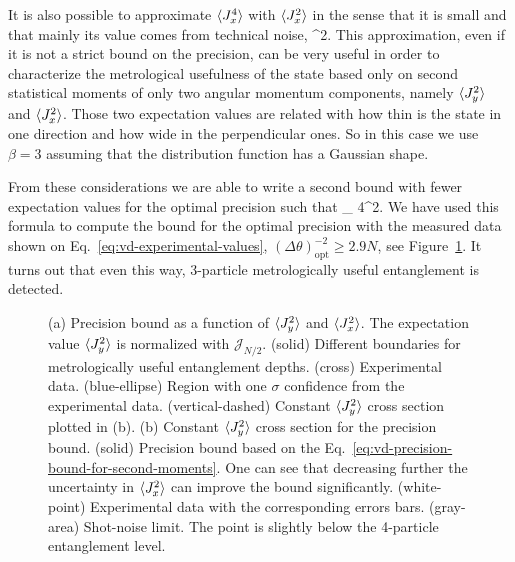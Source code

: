 It is also possible to approximate $\langle{J_x^4}\rangle$ with $\expect{J_x^2}$ in the sense that it is small and that mainly its value comes from technical noise,
\be
   \approx \beta {}^2.
\ee
This approximation, even if it is not a strict bound on the precision, can be very useful in order to characterize the metrological usefulness of the state based only on second statistical moments of only two angular momentum components, namely $\expect{J_y^2}$ and $\expect{J_x^2}$.
Those two expectation values are related with how  thin is the state in one direction and how wide in the perpendicular ones.
So in this case we use $\beta=3$ assuming that the distribution function has a Gaussian shape.

From these considerations we are able to write a second bound with fewer expectation values for the optimal precision such that
\be
  \varian{\theta}_{} \leqslant {}
  {4^2}.
  \label{eq:vd-precision-bound-for-second-moments}
\ee
We have used this formula to compute the bound for the optimal precision with the measured data shown on Eq.~\eqref{eq:vd-experimental-values}, $(\Delta \theta)^{-2}_{\text{opt}} \geqslant 2.9N$, see Figure~\ref{fig:vd-experimental}.
It turns out that even this way, 3-particle metrologically useful entanglement is detected.
\begin{figure}[htp]
  \centering
  \caption[(a) Precision bound for $\expect{J_y^2}$ and $\expect{J_x^2}$. (b) Slice in constant $\expect{J_y^2}$.]{
  (a) Precision bound as a function of $\expect{J_y^2}$ and $\expect{J_x^2}$.
  The expectation value $\expect{J_y^2}$ is normalized with $\mathcal{J}_{N/2}$.
  (solid) Different boundaries for metrologically useful entanglement depths.
  (cross) Experimental data.
  (blue-ellipse) Region with one $\sigma$ confidence from the experimental data.
  (vertical-dashed) Constant $\expect{J_y^2}$ cross section plotted in (b).
  (b) Constant $\expect{J_y^2}$ cross section for the precision bound.
  (solid) Precision bound based on the Eq.~\eqref{eq:vd-precision-bound-for-second-moments}.
  One can see that decreasing further the uncertainty in $\expect{J_x^2}$ can improve the bound significantly.
  (white-point) Experimental data with the corresponding errors bars.
  (gray-area) Shot-noise limit.
  The point is slightly below the 4-particle entanglement level.}
  \label{fig:vd-experimental}
\end{figure}

